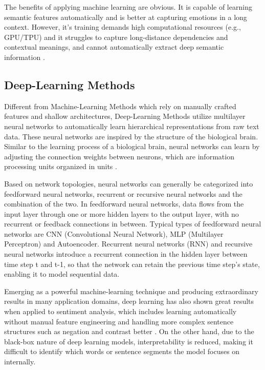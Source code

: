 \documentclass{xum_review}
\begin{document}
The benefits of applying machine learning are obvious. It is capable of learning
semantic features automatically and is better at capturing emotions in a long
context. However, it's training demands high computational resources (e.g.,
GPU/TPU) \citep{young2018recent} and it struggles to capture long-distance
dependencies and contextual meanings, and cannot automatically extract deep
semantic information \citep{ribeiro2016why}. 

\subsection{Deep-Learning Methods}

Different from Machine-Learning Methods which rely on manually crafted features
and shallow architectures, Deep-Learning Methods utilize multilayer neural
networks to automatically learn hierarchical representations from raw text data.
These neural networks are inspired by the structure of the biological brain.
Similar to the learning process of a biological brain, neural networks can learn
by adjusting the connection weights between neurons, which are information
processing units organized in units \citep{lecun2015deep}.

Based on network topologies, neural networks can generally be categorized into
feedforward neural networks, recurrent or recursive neural networks and the
combination of the two. In feedforward neural networks, data flows from the
input layer through one or more hidden layers to the output layer, with no
recurrent or feedback connections in between\citep{heaton-2017}. Typical types of
feedforward neural networks are CNN (Convolutional Neural Network), MLP
(Multilayer Perceptron) and Autoencoder. Recurrent neural networks (RNN) and
recursive neural networks introduce a recurrent connection in the hidden layer
between time step t and t-1, so that the network can retain the previous time
step's state, enabling it to model sequential data. 

Emerging as a powerful machine-learning technique and producing extraordinary
results in many application domains, deep learning has also shown great results
when applied to sentiment analysis, which includes learning automatically
without manual feature engineering and handling more complex sentence structures
such as negation and contrast better \citep{yang2016hierarchical}. On the other hand, due
to the black-box nature of deep learning models, interpretability is reduced,
making it difficult to identify which words or sentence segments the model
focuses on internally.
\end{document}
